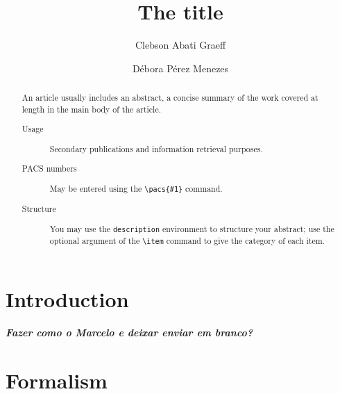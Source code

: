 \documentclass[prc, reprint, amsmath, linenumbers,10pt]{revtex4-1}
\newcommand{\comment}[1]{{\bf\textit{#1}}}
\begin{document}

%
%

\title{The title}

\author{Clebson Abati Graeff}

\author{Débora Pérez Menezes}


\begin{abstract}
An article usually includes an abstract, a concise summary of the work
covered at length in the main body of the article. 
\begin{description}
\item[Usage]
Secondary publications and information retrieval purposes.
\item[PACS numbers]
May be entered using the \verb+\pacs{#1}+ command.
\item[Structure]
You may use the \texttt{description} environment to structure your abstract;
use the optional argument of the \verb+\item+ command to give the category of each item. 
\end{description}
\end{abstract}




\maketitle

%
%

\section{Introduction}

\comment{Fazer como o Marcelo e deixar enviar em branco?}

\section{Formalism}
\end{document}
